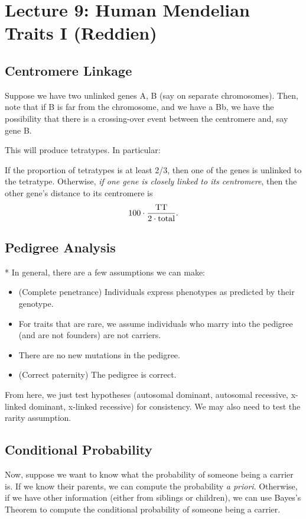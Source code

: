 \section*{Lecture 9: Human Mendelian Traits I (Reddien)}
\setcounter{section}{9}
\setcounter{subsection}{0}
\setcounter{defn}{0}
\setcounter{defncontainer}{0}

\subsection{Centromere Linkage}

Suppose we have two unlinked genes A, B (say on separate chromosomes).
Then, note that if B is far from the chromosome, and we have a Bb, we have the possibility that there is a crossing-over event between the centromere and, say gene B.

This will produce tetratypes. In particular:
\begin{fact}
	If the proportion of tetratypes is at least 2/3, then one of the genes is unlinked to the tetratype. Otherwise, \emph{if one gene is closely linked to its centromere}, then the other gene's distance to its centromere is \[
		100 \cdot \frac{\textnormal{TT}}{2\cdot \textnormal{total}}.
	\]
\end{fact}

\subsection{Pedigree Analysis}

\begin{fact}*
	In general, there are a few assumptions we can make:
	\begin{itemize}
		\item (Complete penetrance) Individuals express phenotypes as predicted by their genotype.
		\item For traits that are rare, we assume individuals who marry into the pedigree (and are not founders) are not carriers.
		\item There are no new mutations in the pedigree.
		\item (Correct paternity) The pedigree is correct.
	\end{itemize}
	From here, we just test hypotheses (autosomal dominant, autosomal recessive, x-linked dominant, x-linked recessive) for consistency.
	We may also need to test the rarity assumption.
\end{fact}

\subsection{Conditional Probability}

Now, suppose we want to know what the probability of someone being a carrier is.
If we know their parents, we can compute the probability \emph{a priori}.
Otherwise, if we have other information (either from siblings or children), we can use Bayes's Theorem to compute the conditional probability of someone being a carrier.

